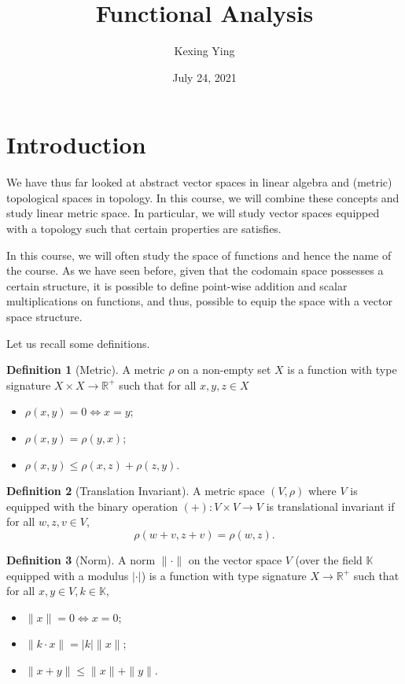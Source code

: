\documentclass[]{article}
\title{Functional Analysis}
\author{Kexing Ying}
\date{July 24, 2021}
\theoremstyle{definition}
\theoremstyle{definition}
\newtheorem{definition}{Definition}[section]
\begin{document}
\maketitle

{
\hypersetup{linkcolor=}
\setcounter{tocdepth}{2}
\tableofcontents
}
\newpage

\section{Introduction}

We have thus far looked at abstract vector spaces in linear algebra and 
(metric) topological spaces in topology. In this course, we will combine these 
concepts and study linear metric space. In particular, we will study 
vector spaces equipped with a topology such that certain properties are 
satisfies. 

In this course, we will often study the space of functions and hence 
the name of the course. As we have seen before, given that the codomain space 
possesses a certain structure, it is possible to define point-wise addition and 
scalar multiplications on functions, and thus, possible to equip the space 
with a vector space structure. 

Let us recall some definitions.

\begin{definition}[Metric]
  A metric \(\rho\) on a non-empty set \(X\) is a function with type signature 
  \(X \times X \to \mathbb{R}^+\) such that for all \(x, y, z \in X\)
  \begin{itemize}
    \item \(\rho(x, y) = 0 \iff x = y\);
    \item \(\rho(x, y) = \rho (y, x)\);
    \item \(\rho(x, y) \le \rho(x, z) + \rho(z, y)\).
  \end{itemize}
\end{definition}

\begin{definition}[Translation Invariant]
  A metric space \((V, \rho)\) where \(V\) is equipped with the binary operation 
  \((+) : V \times V \to V\) is translational invariant if for all \(w, z, v \in V\), 
  \[\rho(w + v, z + v) = \rho(w, z).\]
\end{definition}

\begin{definition}[Norm]
  A norm \(\|\cdot\|\) on the vector space \(V\) (over the field 
  \(\mathbb{K}\) equipped with a modulus \(|\cdot|\)) 
  is a function with type signature \(X \to \mathbb{R}^+\) such that for all 
  \(x, y \in V, k \in \mathbb{K}\),
  \begin{itemize}
    \item \(\|x\| = 0 \iff x = 0\);
    \item \(\|k \cdot x\| = |k| \|x\|\);
    \item \(\|x + y\| \le \|x\| + \|y\|\).
  \end{itemize} 
\end{definition}
\end{document}
